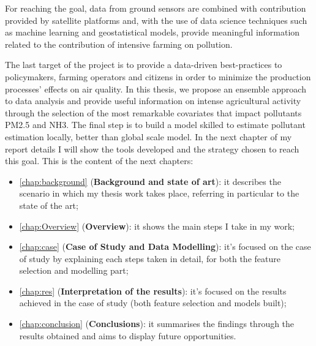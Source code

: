 For reaching the goal, data from ground sensors are combined with contribution provided by satellite platforms and, with the use of data science techniques such as machine learning and geostatistical models, provide meaningful information related to the contribution of intensive farming on pollution.\par
The last target of the project is to provide a data-driven best-practices to policymakers, farming operators and citizens in order to minimize the production processes' effects on air quality.
\bigskip
In this thesis, we propose an ensemble approach to data analysis and provide useful information on intense agricultural activity through the selection of the most remarkable covariates that impact pollutants PM2.5 and NH3. 
The final step is to build a model skilled to estimate pollutant estimation locally, better than global scale model.  
In the next chapter of my report details I will show the tools developed and the strategy chosen to reach this goal. 
This is the content of the next chapters:

\begin{itemize}
  \item \autoref{chap:background} (\textbf{Background and state of art}): it describes the scenario in which my thesis work takes place, referring in particular to the state of the art;
  \item \autoref{chap:Overview} (\textbf{Overview}): it shows the main steps I take in my work;
  \item \autoref{chap:case} (\textbf{Case of Study and Data Modelling}): it's focused on the case of study by explaining each steps taken in detail, for both the feature selection and modelling part;
 \item \autoref{chap:res} (\textbf{Interpretation of the results}): it's focused on the results achieved in the case of study (both feature selection and models built);
 \item \autoref{chap:conclusion} (\textbf{Conclusions}): it summarises the findings through the results obtained and aims to display future opportunities.  
\end{itemize}

